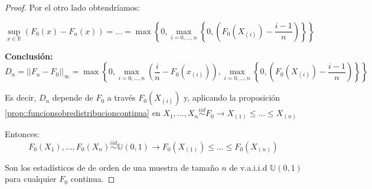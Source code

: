 \begin{proof}
Por el otro lado obtendríamos:

\[
\sup_{x\in ℝ} (F_0(x) - F_n(x)) = ... = \max \left\{0,\max_{i=0,...,n} \left\{0, \left(F_0(X_{(i)}) - \frac{i-1}{n}\right)\right\}\right\}
\]

\textbf{Conclusión:}
\[D_n = ||F_n - F_0||_{\infty} = \max \left\{ 0, \max_{i=0,...,n} \left( \frac{i}{n} - F_0(x_{(i)})\right), \max_{i=0,...,n} \left\{0, \left(F_0(X_{(i)}) - \frac{i-1}{n}\right)\right\}\right\}\]

Es decir, $D_n$ depende de $F_0$ a través $F_0(X_{(i)})$ y, aplicando la proposición \ref{prop::funcionsobredistribucioncontinua} en $X_1,...,X_n \overset{iid}{\sim} F_0 \to X_{(1)} \leq ... \leq X_{(n)}$

Entonces: 
\[
F_0(X_1),...,F_0(X_n) \overset{iid}{\sim} \mathbb{U}(0,1) \to F_0(X_{(1)})\leq ... \leq F_0(X_{(n)})
\]


Son los estadísticos de de orden de una muestra de tamaño $n$ de v.a.i.i.d $\mathbb{U}(0,1)$ para cualquier $F_0$ continua.

\end{proof}

